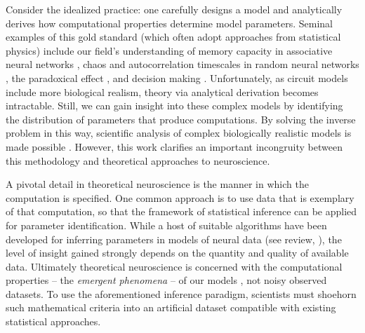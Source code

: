 \documentclass[11pt]{article}
\begin{document}
Consider the idealized practice: one carefully designs a model and analytically derives how computational properties determine model parameters.
Seminal examples of this gold standard (which often adopt approaches from statistical physics) include our field's understanding of memory capacity in associative neural networks \cite{hopfield1982neural}, chaos and autocorrelation timescales in random neural networks \cite{sompolinsky1988chaos}, the paradoxical effect \cite{tsodyks1997paradoxical}, and decision making \cite{wong2006recurrent}.
Unfortunately, as circuit models include more biological realism, theory via analytical derivation becomes intractable.
Still, we can gain insight into these complex models by identifying the distribution of parameters that produce computations.
By solving the inverse problem in this way, scientific analysis of complex biologically realistic models is made possible \cite{foster1993significance, prinz2004similar, achard2006complex, o2014cell, alonso2019visualization}.
However, this work clarifies an important incongruity between this methodology and theoretical approaches to neuroscience.

A pivotal detail in theoretical neuroscience is the manner in which the computation is specified.
One common approach is to use data that is exemplary of that computation, so that the framework of statistical inference can be applied for parameter identification.
While a host of suitable algorithms have been developed for inferring parameters in models of neural data \cite{kass2001spike, brown1998statistical, paninski2004maximum, truccolo2005point, schneidman2006weak, druckmann2007novel, turner2007maximum, byron2009gaussian, macke2011empirical, park2011bayesian, granot2013stimulus, latimer2015single, lakshminarasimhan2018dynamic, duncker2019learning, ladenbauer2019inferring, gao2016linear, zhao2017recursive, barello2018sparse, pandarinath2018inferring, wiltschko2015mapping, johnson2016composing, batty2019behavenet} (see review, \cite{paninski2018neural}), the level of insight gained strongly depends on the quantity and quality of available data.
Ultimately theoretical neuroscience is concerned with the computational properties -- the \emph{emergent phenomena} -- of our models \cite{hopfield1982neural, sompolinsky1988chaos, tsodyks1997paradoxical, wong2006recurrent}, not noisy observed datasets.
To use the aforementioned inference paradigm, scientists must shoehorn such mathematical criteria into an artificial dataset compatible with existing statistical approaches.
\end{document}
